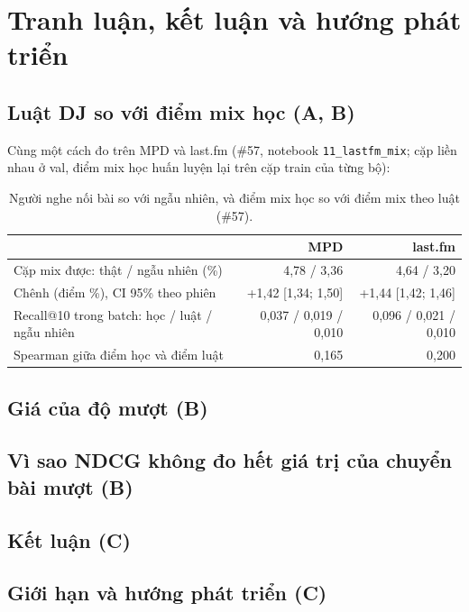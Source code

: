 \section{Tranh luận, kết luận và hướng phát triển}

\subsection{Luật DJ so với điểm mix học (A, B)}
Cùng một cách đo trên MPD và last.fm (\#57, notebook \texttt{11\_lastfm\_mix}; cặp liền nhau ở val, điểm mix học huấn luyện lại trên cặp train của từng bộ):
\begin{table}[htbp]\centering
\caption{Người nghe nối bài so với ngẫu nhiên, và điểm mix học so với điểm mix theo luật (\#57).}
\begin{tabular}{lrr}
\toprule
& MPD & last.fm \\
\midrule
Cặp mix được: thật / ngẫu nhiên (\%) & 4,78 / 3,36 & 4,64 / 3,20 \\
Chênh (điểm \%), CI 95\% theo phiên & +1,42 [1,34; 1,50] & +1,44 [1,42; 1,46] \\
Recall@10 trong batch: học / luật / ngẫu nhiên & 0,037 / 0,019 / 0,010 & 0,096 / 0,021 / 0,010 \\
Spearman giữa điểm học và điểm luật & 0,165 & 0,200 \\
\bottomrule
\end{tabular}
\end{table}

\subsection{Giá của độ mượt (B)}

\subsection{Vì sao NDCG không đo hết giá trị của chuyển bài mượt (B)}

\subsection{Kết luận (C)}

\subsection{Giới hạn và hướng phát triển (C)}

